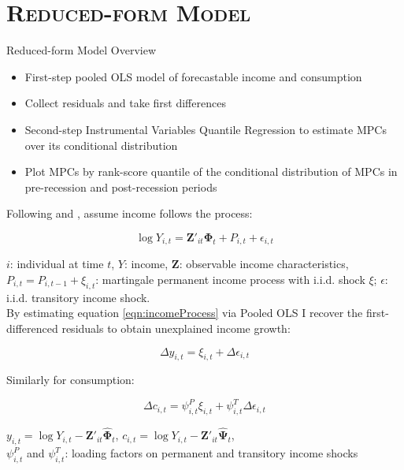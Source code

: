 \documentclass{beamer}
\begin{document}
\section{\scshape Reduced-form Model}
\begin{frame}{Reduced-form Model Overview}
\begin{itemize}
	\item First-step pooled OLS model of forecastable income and consumption 
	\item Collect residuals and take first differences
	\item Second-step Instrumental Variables Quantile Regression to estimate MPCs over its conditional distribution
	\item Plot MPCs by rank-score quantile of the conditional distribution of MPCs in pre-recession and post-recession periods
\end{itemize}	
	
\end{frame}	

\begin{frame}
Following \citet{BPP} and \citet{KaplanViolanteWeidner2014}, assume income follows the process:

\begin{equation}
\label{eqn:incomeProcess}
\log Y_{i,t} = \mathbf{Z}'_{it}\mathbf{\Phi}_t + P_{i,t} + \epsilon_{i,t}
\end{equation}

{\tiny $i$: individual at time $t$, $Y$: income, $\mathbf{Z}$: observable income characteristics, $P_{i,t} = P_{i,t-1} + \xi_{i,t}$: martingale permanent income process with i.i.d. shock $\xi$; $\epsilon$: i.i.d. transitory income shock.} \\


\vspace{2mm}
By estimating equation \ref{eqn:incomeProcess} via Pooled OLS I recover the first-differenced residuals to obtain unexplained income growth:

\begin{equation*}
\Delta y_{i,t} = \xi_{i,t} + \Delta \epsilon_{i,t}
\end{equation*}

Similarly for consumption:

\begin{equation*}
\Delta c_{i,t} = \psi^{P}_{i,t}\xi_{i,t} + \psi^{T}_{i,t}\Delta \epsilon_{i,t}
\end{equation*}

{\tiny $y_{i,t} = \log Y_{i,t} - \mathbf{Z}'_{it}\hat{\mathbf{\Phi}}_t $, $c_{i,t} = \log Y_{i,t} - \mathbf{Z}'_{it}\hat{\mathbf{\Psi}}_t $,\\ $\psi^{P}_{i,t}$ and $\psi^{T}_{i,t}$: loading factors on permanent and transitory income shocks}

\end{frame}
\end{document}
